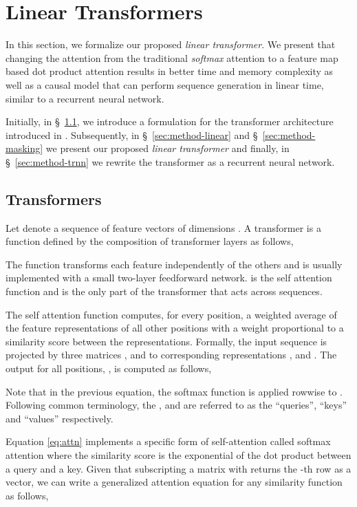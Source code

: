 \documentclass{article}
\newcommand{\linear}{\emph{linear transformer}}
\begin{document}
\section{Linear Transformers}

In this section, we formalize our proposed \linear{}. We present
that changing the attention from the traditional \emph{softmax} attention to a
feature map based dot product attention results in better time and memory
complexity as well as a causal model that can perform sequence generation in
linear time, similar to a recurrent neural network.

Initially, in \S~\ref{sec:method-intro}, we introduce a formulation for the
transformer architecture introduced in \cite{vaswani_attn}. Subsequently, in
\S~\ref{sec:method-linear} and \S~\ref{sec:method-masking} we present our
proposed \linear{} and finally, in \S~\ref{sec:method-trnn} we rewrite the
transformer as a recurrent neural network.

\subsection{Transformers} \label{sec:method-intro}


Let  denote a sequence of  feature vectors of dimensions
. A transformer is a function 
defined by the composition of  transformer layers  as follows,

The function  transforms each feature independently of the others
and is usually implemented with a small two-layer feedforward network.  is the self
attention function and is the only part of the transformer that acts across
sequences.

The self attention function  computes, for every position, a
weighted average of the feature representations of all other positions with a
weight proportional to a similarity score between the representations.
Formally, the input sequence  is projected by three matrices ,  and  to
corresponding representations ,  and . The output for all
positions, , is computed as follows,

Note that in the previous equation, the softmax function is applied rowwise to
. Following common terminology, the ,  and  are referred to
as the ``queries'', ``keys'' and ``values'' respectively.

Equation \ref{eq:attn} implements a specific form of self-attention called
softmax attention where the similarity score is the exponential of the dot
product between a query and a key. Given that subscripting a matrix with 
returns the -th row as a vector, we can write a generalized attention
equation for any similarity function as follows,
\end{document}
